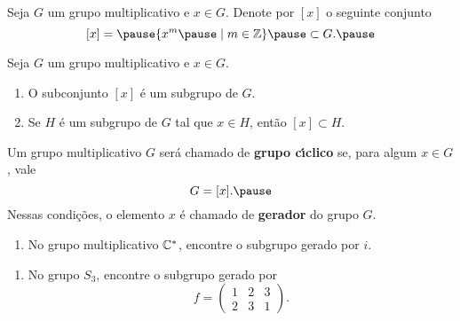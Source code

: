 \documentclass{beamer}
\begin{document}
    \begin{frame}
        Seja $G$ um grupo multiplicativo \pause e $x \in G$. \pause Denote por $[x]$ \pause o seguinte conjunto \pause
        \[
            [x] = \pause \{x^m \pause \mid m \in \z\} \pause \subset G.\pause
        \]

        \begin{proposicao}
            Seja $G$ um grupo multiplicativo \pause e $x \in G$. \pause
            \begin{enumerate}[label={\roman*})]
                \item O subconjunto $[x]$ \pause é um subgrupo de $G$.\pause

                \item Se $H$ é um subgrupo de $G$ \pause tal que $x \in H$, \pause então $[x] \subset H$.
            \end{enumerate}
        \end{proposicao}
    \end{frame}

    \begin{frame}
        \begin{definicao}
            Um grupo multiplicativo $G$ \pause será chamado de \textbf{grupo c{\'\i}clico} \pause se, para algum $x \in G$, \pause vale \pause
            \[
                G = [x]. \pause
            \]
            Nessas condiç\~oes, o elemento $x$  \pause é chamado de \textbf{gerador} do grupo $G$.
        \end{definicao}
    \end{frame}

    \begin{frame}
        \begin{exemplos}
            \begin{enumerate}[label={\roman*})]
                \item No grupo multiplicativo $\mathbb{C}^*$, \pause encontre o subgrupo gerado por $i$.
                \seti
            \end{enumerate}
        \end{exemplos}
    \end{frame}

    \begin{frame}
        \begin{exemplos}
            \begin{enumerate}[label={\roman*})]
                \conti
                \item No grupo $S_3$, \pause encontre o subgrupo gerado por
                \[
                    f = \begin{pmatrix}
                        1 & 2 & 3\\
                        2 & 3 & 1
                    \end{pmatrix}.
                \]
            \end{enumerate}
        \end{exemplos}
    \end{frame}
\end{document}
